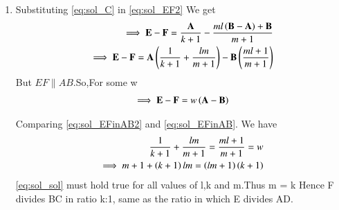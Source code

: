 \begin{enumerate}[label=\thesection.\arabic*.,ref=\thesection.\theenumi]
\item Substituting \ref{eq:sol_C} in \ref{eq:sol_EF2} We get
\begin{align}
\implies \mathbf{E} - \mathbf{F} = \frac{\mathbf{A}}{k+1}-\frac{{{ml\left(\mathbf{B}-\mathbf{A}\right)} +\mathbf{B}}}{m+1}
\\
\implies \mathbf{E} - \mathbf{F} = \mathbf{A}\left(\frac{1}{k+1} + \frac{lm}{m+1}\right) - \mathbf{B}\left(\frac{ml+1}{m+1}\right)
\label{eq:sol_EFinAB}
\end{align}
But $ EF \parallel AB$.So,For some w
\begin{align}
\implies \mathbf{E} - \mathbf{F} = w\left(\mathbf{A}-\mathbf{B}\right)
\label{eq:sol_EFinAB2}
\end{align}

Comparing \ref{eq:sol_EFinAB2} and \ref{eq:sol_EFinAB}. We have
\begin{align}
\frac{1}{k+1} + \frac{lm}{m+1} = \frac{ml+1}{m+1} = w
\\
\implies m+1+\left(k+1\right)lm = \left(lm+1\right)\left(k+1\right) 
\label{eq:sol_sol}
\end{align}
\ref{eq:sol_sol} must hold true for all values of l,k and m.Thus m = k
\newline
Hence F divides BC in ratio k:1, same as the ratio in which E divides AD.
\end{enumerate}

